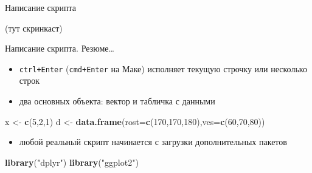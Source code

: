 \documentclass[ignorenonframetext,]{beamer}
\newenvironment{Shaded}{\begin{snugshade}}{\end{snugshade}}
\newcommand{\KeywordTok}[1]{\textcolor[rgb]{0.13,0.29,0.53}{\textbf{{#1}}}}
\newcommand{\DataTypeTok}[1]{\textcolor[rgb]{0.13,0.29,0.53}{{#1}}}
\newcommand{\DecValTok}[1]{\textcolor[rgb]{0.00,0.00,0.81}{{#1}}}
\newcommand{\StringTok}[1]{\textcolor[rgb]{0.31,0.60,0.02}{{#1}}}
\newcommand{\NormalTok}[1]{{#1}}
\begin{document}
\begin{frame}{Написание скрипта}

(тут скринкаст)

\end{frame}

\begin{frame}[fragile]{Написание скрипта. Резюме\ldots{}}

\begin{itemize}
\item
  \texttt{ctrl+Enter} (\texttt{cmd+Enter} на Маке) исполняет текущую
  строчку или несколько строк
\item
  два основных объекта: вектор и табличка с данными
\end{itemize}

\begin{Shaded}
\begin{Highlighting}[]
\NormalTok{x <-}\StringTok{ }\KeywordTok{c}\NormalTok{(}\DecValTok{5}\NormalTok{,}\DecValTok{2}\NormalTok{,}\DecValTok{1}\NormalTok{)}
\NormalTok{d <-}\StringTok{ }\KeywordTok{data.frame}\NormalTok{(}\DataTypeTok{rost=}\KeywordTok{c}\NormalTok{(}\DecValTok{170}\NormalTok{,}\DecValTok{170}\NormalTok{,}\DecValTok{180}\NormalTok{),}\DataTypeTok{ves=}\KeywordTok{c}\NormalTok{(}\DecValTok{60}\NormalTok{,}\DecValTok{70}\NormalTok{,}\DecValTok{80}\NormalTok{))}
\end{Highlighting}
\end{Shaded}

\begin{itemize}
\itemsep1pt\parskip0pt
\item
  любой реальный скрипт начинается с загрузки дополнительных пакетов
\end{itemize}

\begin{Shaded}
\begin{Highlighting}[]
\KeywordTok{library}\NormalTok{(}\StringTok{"dplyr"}\NormalTok{)}
\KeywordTok{library}\NormalTok{(}\StringTok{"ggplot2"}\NormalTok{)}
\end{Highlighting}
\end{Shaded}

\end{frame}
\end{document}
